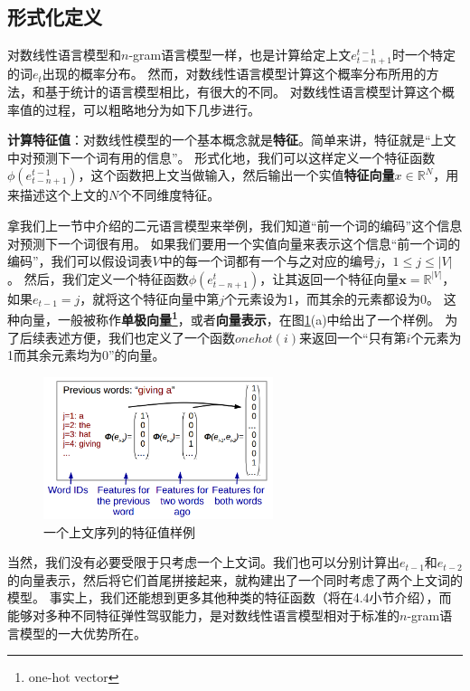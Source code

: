 \documentclass[10pt,a4paper]{ctexart}
\begin{document}
\subsection{形式化定义}
对数线性语言模型和$n$-gram语言模型一样，也是计算给定上文$e_{t-n+1}^{t-1}$时一个特定的词$e_t$出现的概率分布。
然而，对数线性语言模型计算这个概率分布所用的方法，和基于统计的语言模型相比，有很大的不同。
对数线性语言模型计算这个概率值的过程，可以粗略地分为如下几步进行。

\textbf{计算特征值}：对数线性模型的一个基本概念就是\textbf{特征}。简单来讲，特征就是“上文中对预测下一个词有用的信息”。
形式化地，我们可以这样定义一个特征函数$\phi (e_{t-n+1}^{t-1})$，这个函数把上文当做输入，然后输出一个实值\textbf{特征向量$x$}$\in \mathbb{R}^N$，用来描述这个上文的$N$个不同维度特征。

拿我们上一节中介绍的二元语言模型来举例，我们知道“前一个词的编码”这个信息对预测下一个词很有用。
如果我们要用一个实值向量来表示这个信息“前一个词的编码”，我们可以假设词表$V$中的每一个词都有一个与之对应的编号$j$，$1 \leq j \leq |V|$。
然后，我们定义一个特征函数$\phi (e_{t-n+1}^t)$，让其返回一个特征向量$\textbf{x} = \mathbb{R}^{|V|}$，如果$e_{t-1}=j$，就将这个特征向量中第$j$个元素设为1，而其余的元素都设为0。
这种向量，一般被称作\textbf{单极向量\footnote{one-hot vector}}，或者\textbf{向量表示}，在图\ref{fig:4}(a)中给出了一个样例。
为了后续表述方便，我们也定义了一个函数$onehot(i)$来返回一个“只有第$i$个元素为1而其余元素均为0”的向量。

\begin{figure}[H]
\centering
\includegraphics[width=0.6\textwidth]{fig4.png}
\caption{一个上文序列的特征值样例}
\label{fig:4}
\end{figure}

当然，我们没有必要受限于只考虑一个上文词。我们也可以分别计算出$e_{t-1}$和$e_{t-2}$的向量表示，然后将它们首尾拼接起来，就构建出了一个同时考虑了两个上文词的模型。
事实上，我们还能想到更多其他种类的特征函数（将在4.4小节介绍），而能够对多种不同特征弹性驾驭能力，是对数线性语言模型相对于标准的$n$-gram语言模型的一大优势所在。
\end{document}
